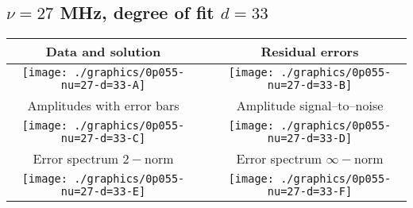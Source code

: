 

% 

\clearpage{}
\break{}

\subsection{$\nu = 27$ MHz, degree of fit $d = 33$}

\begin{table}[h]
    \begin{center}
        \begin{tabular}{ccc}
            Data and solution & \quad & Residual errors \\\hline
            \texttt{[image: ./graphics/0p055-nu=27-d=33-A]} &&
            \texttt{[image: ./graphics/0p055-nu=27-d=33-B]} \\[15pt]
            Amplitudes with error bars && Amplitude signal--to--noise \\\hline
            \texttt{[image: ./graphics/0p055-nu=27-d=33-C]} &&
            \texttt{[image: ./graphics/0p055-nu=27-d=33-D]} \\[15pt]
            Error spectrum $2-$norm && Error spectrum $\infty-$norm \\\hline
            \texttt{[image: ./graphics/0p055-nu=27-d=33-E]} &&
            \texttt{[image: ./graphics/0p055-nu=27-d=33-F]} \\[15pt]
        \end{tabular}
    \end{center}
\label{fig:elev=55, nu=27}
\end{table}



\endinput
